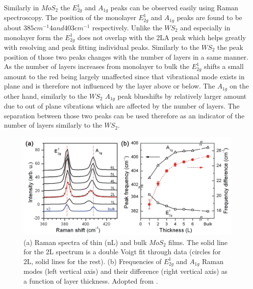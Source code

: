 Similarly in $MoS_2$ the $E^1_{2g}$ and $A_{1g}$ peaks can be observed easily using Raman spectroscopy. The position of the monolayer $E^1_{2g}$ and $A_{1g}$ peaks are found to be about $385 cm^{-1}4 and 403 cm^{-1}$ respectively. Unlike the $WS_2$ and especially in monolayer form the $E^1_{2g}$ does not overlap with the 2LA peak which helps greatly with resolving and peak fitting individual peaks. Similarly to the $WS_2$ the peak position of those two peaks changes with the number of layers in a same manner. As the number of layers increases from monolayer to bulk the $E^1_{2g}$ shifts a small amount to the red being largely unaffected since that vibrational mode exists in plane and is therefore not influenced by the layer above or below. The $A_{1g}$ on the other hand, similarly to the $WS_2$ $A_{1g}$ peak blueshifts by relatively larger amount due to out of plane vibrations which are affected by the number of layers. The separation between those two peaks can be used therefore as an indicator of the number of layers similarly to the $WS_2$. 

\begin{figure}[h]
	\begin{center}
		\includegraphics[scale=0.3]{NumberLayerIdentificationRamanMoS2.png}
		\caption{(a) Raman spectra of thin (nL) and bulk $MoS_2$ films. The solid line for the 2L spectrum is a double Voigt fit through data (circles for 2L, solid lines for the rest). (b) Frequencies of $E^1_{2g}$ and $A_{1g}$ Raman modes (left vertical axis) and their difference (right vertical axis) as a function of layer thickness. Adopted from \cite{Lee2010}.}
		\label{fig:NumberLayerIdentificationRamanMoS2}
	\end{center}
\end{figure}